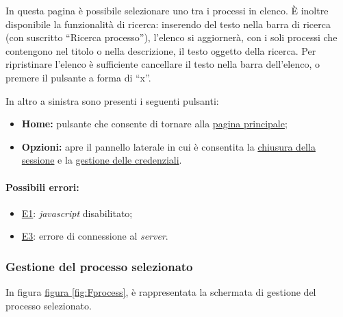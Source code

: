 In questa pagina è possibile selezionare uno tra i processi in elenco. È inoltre disponibile la funzionalità di ricerca: inserendo del testo nella barra di ricerca (con suscritto ``Ricerca processo''), l'elenco si aggiornerà, con i soli processi che contengono nel titolo o nella descrizione, il testo oggetto della ricerca.
Per ripristinare l'elenco è sufficiente cancellare il testo nella barra dell'elenco, o premere il pulsante a forma di ``x''.

In altro a sinistra sono presenti i seguenti pulsanti:
\begin{itemize}
\item \textbf{Home:} pulsante che consente di tornare alla \hyperref[home]{pagina principale};
\item \textbf{Opzioni:} apre il pannello laterale in cui è consentita la \hyperref[logout]{chiusura della sessione} e la \hyperref[userdata]{gestione delle credenziali}.
\end{itemize}

\paragraph*{Possibili errori:}
\begin{itemize}
\item \hyperref[e1]{E1}: \textit{javascript} disabilitato;
\item \hyperref[e3]{E3}: errore di connessione al \textit{server}.
\end{itemize}

\subsubsection{Gestione del processo selezionato}

In figura \hyperref[fig:Fprocess]{figura \ref{fig:Fprocess}}, è rappresentata la schermata di gestione del processo selezionato.

